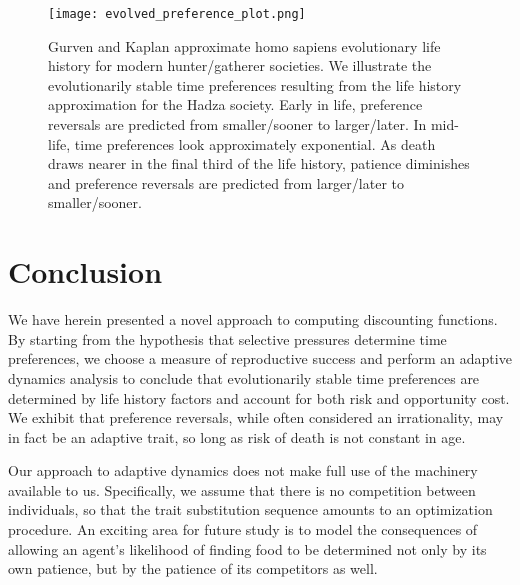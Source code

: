 \documentclass[titlepage, hidelinks, 12pt]{article}
\theoremstyle{plain}
\theoremstyle{remark}
\theoremstyle{definition}
\begin{document}
\begin{figure}[h]
    \centering
    \texttt{[image: evolved\_preference\_plot.png]}
    \caption[Induced time preferences from an average evolutionary life history.]{Gurven and Kaplan \cite{gurven07} approximate homo sapiens evolutionary life history for modern hunter/gatherer societies. 
    We illustrate the evolutionarily stable time preferences resulting from the life history approximation for the Hadza society. Early in life,
preference reversals are predicted from smaller/sooner to larger/later. In mid-life, time preferences look approximately exponential. As death
draws nearer in the final third of the life history, patience diminishes and preference reversals are predicted from larger/later to smaller/sooner.}
\end{figure}























\section{Conclusion}
We have herein presented a novel approach to computing discounting functions. 
By starting from the hypothesis that selective pressures determine time preferences,
we choose a measure of reproductive success and perform an adaptive dynamics analysis to conclude that evolutionarily stable time preferences are 
determined by life history factors and account
for both risk and opportunity cost. We exhibit that preference reversals, while often considered an irrationality, may in fact be an adaptive trait,
so long as risk of death is not constant in age. 

Our approach to adaptive dynamics does not make full use of the machinery available to us. Specifically, we assume that there is no competition between
individuals, so that the trait substitution sequence amounts to an optimization procedure. An exciting area for future study is to model the 
consequences of allowing an agent's likelihood of finding food to be determined not only by its own patience, but by the patience of
its competitors as well. 

\newpage

{}
\end{document}
